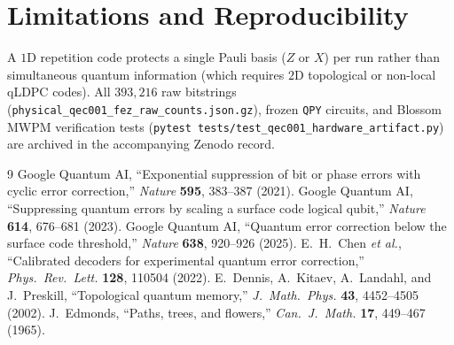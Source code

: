 \documentclass[11pt,twocolumn]{article}
\begin{document}
\section{Limitations and Reproducibility}
A $1\text{D}$ repetition code protects a single Pauli basis ($Z$ or $X$) per run rather than simultaneous quantum information (which requires $2\text{D}$ topological or non-local qLDPC codes). All $393{,}216$ raw bitstrings (\texttt{physical\_qec001\_fez\_raw\_counts.json.gz}), frozen \texttt{QPY} circuits, and Blossom MWPM verification tests (\texttt{pytest tests/test\_qec001\_hardware\_artifact.py}) are archived in the accompanying Zenodo record.

\begin{thebibliography}{9}
 Google Quantum AI, ``Exponential suppression of bit or phase errors with cyclic error correction,'' \emph{Nature} \textbf{595}, 383--387 (2021).
 Google Quantum AI, ``Suppressing quantum errors by scaling a surface code logical qubit,'' \emph{Nature} \textbf{614}, 676--681 (2023).
 Google Quantum AI, ``Quantum error correction below the surface code threshold,'' \emph{Nature} \textbf{638}, 920--926 (2025).
 E.~H.~Chen \emph{et al.}, ``Calibrated decoders for experimental quantum error correction,'' \emph{Phys.\ Rev.\ Lett.} \textbf{128}, 110504 (2022).
 E.~Dennis, A.~Kitaev, A.~Landahl, and J.~Preskill, ``Topological quantum memory,'' \emph{J.~Math.\ Phys.} \textbf{43}, 4452--4505 (2002).
 J.~Edmonds, ``Paths, trees, and flowers,'' \emph{Can.\ J.~Math.} \textbf{17}, 449--467 (1965).
\end{thebibliography}
\end{document}
